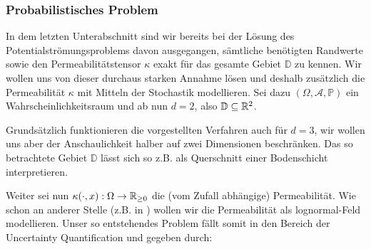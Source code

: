 \subsubsection{Probabilistisches Problem}
In dem letzten Unterabschnitt sind wir bereits bei der Lösung des Potentialströmungsproblems davon ausgegangen, sämtliche benötigten Randwerte sowie den Permeabilitätstensor $\kappa$ exakt für das gesamte Gebiet $\mathbb{D}$ zu kennen.
Wir wollen uns von dieser durchaus starken Annahme lösen und deshalb zusätzlich die Permeabilität $\kappa$ mit Mitteln der Stochastik modellieren.
Sei dazu $(\Omega, \mathcal{A},\mathbb{P})$ ein Wahrscheinlichkeitsraum und ab nun $d=2$, also $\mathbb{D} \subseteq \mathbb{R}^2$.
\begin{Bemerkung}
	Grundsätzlich funktionieren die vorgestellten Verfahren auch für $d=3$, wir wollen uns aber der Anschaulichkeit halber auf zwei Dimensionen beschränken. Das so betrachtete Gebiet $\mathbb{D}$ lässt sich so z.B. als Querschnitt einer Bodenschicht interpretieren.
\end{Bemerkung} 
Weiter sei nun $\kappa (\cdot,x): \Omega \rightarrow \mathbb{R}_{\geq0}$ die (vom Zufall abhängige) Permeabilität.
Wie schon an anderer Stelle (z.B. in \cite{kumar2018multigrid}) wollen wir die Permeabilität als lognormal-Feld modellieren.
Unser so entstehendes Problem fällt somit in den Bereich der Uncertainty Quantification und gegeben durch: 


